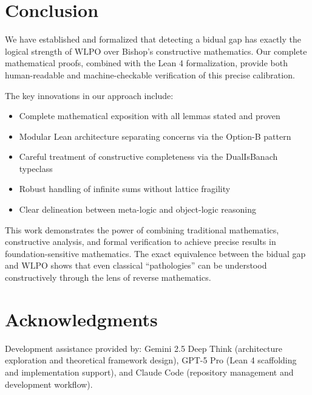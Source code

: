 \documentclass[11pt]{article}  %
\newcommand{\WLPO}{\mathrm{WLPO}}
\begin{document}
\section{Conclusion}

We have established and formalized that detecting a bidual gap has exactly the logical strength of $\WLPO$ over Bishop's constructive mathematics. Our complete mathematical proofs, combined with the Lean 4 formalization, provide both human-readable and machine-checkable verification of this precise calibration.

The key innovations in our approach include:
\begin{itemize}
\item Complete mathematical exposition with all lemmas stated and proven
\item Modular Lean architecture separating concerns via the Option-B pattern
\item Careful treatment of constructive completeness via the DualIsBanach typeclass
\item Robust handling of infinite sums without lattice fragility
\item Clear delineation between meta-logic and object-logic reasoning
\end{itemize}

This work demonstrates the power of combining traditional mathematics, constructive analysis, and formal verification to achieve precise results in foundation-sensitive mathematics. The exact equivalence between the bidual gap and $\WLPO$ shows that even classical ``pathologies'' can be understood constructively through the lens of reverse mathematics.

\section*{Acknowledgments}
Development assistance provided by: Gemini 2.5 Deep Think (architecture exploration and theoretical framework design), GPT-5 Pro (Lean 4 scaffolding and implementation support), and Claude Code (repository management and development workflow).
\end{document}
